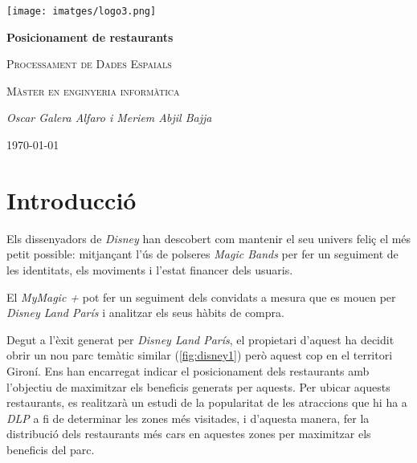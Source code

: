 \documentclass[12pt]{article}
\begin{document}
\begin{titlepage}
		\centering
		\texttt{[image: imatges/logo3.png]}\par\vspace{1cm}
		{\huge\bfseries Posicionament de restaurants\par}
		\vspace{0.3cm}
		{\scshape\Large Processament de Dades Espaials\par}
		\vspace{0.2cm}
		{\scshape\Large Màster en enginyeria informàtica\par}
		\vspace{1.5cm}
		{\Large\itshape Oscar Galera Alfaro i Meriem Abjil Bajja\par}
		\vfill
		{\large \today\par}
\end{titlepage}
\tableofcontents

\clearpage

\listoffigures

\clearpage

\section{Introducció}

Els dissenyadors de \textit{Disney} han descobert com mantenir el seu univers feliç el més petit possible: mitjançant l'ús de polseres \textit{Magic Bands} per fer un seguiment de les identitats, els moviments i l'estat financer dels usuaris.

El \textit{MyMagic +}  pot fer un seguiment dels convidats a mesura que es mouen per \textit{Disney Land París} i analitzar els seus hàbits de compra.

Degut a l'èxit generat per \textit{Disney Land París}, el propietari d'aquest ha decidit obrir un nou parc temàtic similar (\ref{fig:disney1}) però aquest cop en el territori Gironí. Ens han encarregat indicar el posicionament dels restaurants amb l'objectiu de maximitzar els beneficis generats per aquests. Per ubicar aquests restaurants, es realitzarà un estudi de la popularitat de les atraccions que hi ha a \textit{DLP} a fi de determinar les zones més visitades, i d'aquesta manera, fer la distribució dels restaurants més cars en aquestes zones per maximitzar els beneficis del parc.
\end{document}
